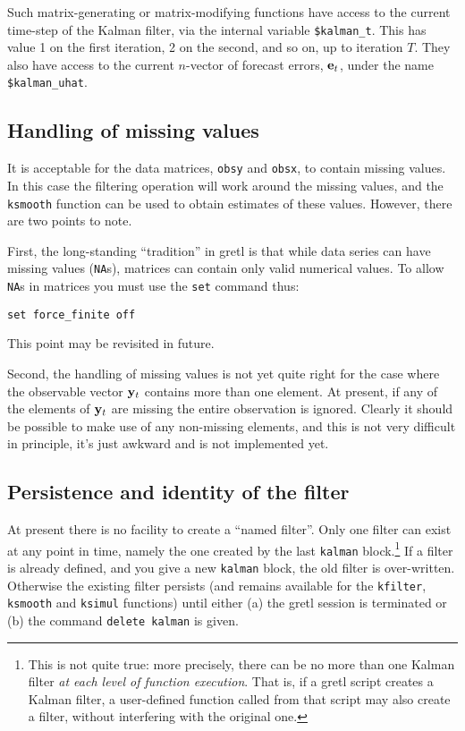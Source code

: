 \documentclass[a4paper]{article}
\newcommand{\obsvec}{\ensuremath\mathbf{y}}
\newcommand{\prederr}{\ensuremath\mathbf{e}}
\begin{document}
Such matrix-generating or matrix-modifying functions have access to
the current time-step of the Kalman filter, via the internal variable
\verb+$kalman_t+.  This has value 1 on the first iteration, 2 on the
second, and so on, up to iteration $T$.  They also have access to
the current $n$-vector of forecast errors, $\prederr_t$, under the
name \verb+$kalman_uhat+.


\subsection{Handling of missing values}

It is acceptable for the data matrices, \texttt{obsy} and
\texttt{obsx}, to contain missing values.  In this case the filtering
operation will work around the missing values, and the \texttt{ksmooth}
function can be used to obtain estimates of these values.  However,
there are two points to note.

First, the long-standing ``tradition'' in gretl is that while data
series can have missing values (\texttt{NA}s), matrices can contain
only valid numerical values.  To allow \texttt{NA}s in matrices you
must use the \texttt{set} command thus:
%
\begin{verbatim}
set force_finite off
\end{verbatim}
%
This point may be revisited in future.  

Second, the handling of missing values is not yet quite right for the
case where the observable vector $\obsvec_t$ contains more than one
element.  At present, if any of the elements of $\obsvec_t$ are
missing the entire observation is ignored.  Clearly it should be
possible to make use of any non-missing elements, and this is not
very difficult in principle, it's just awkward and is not
implemented yet.

\subsection{Persistence and identity of the filter}

At present there is no facility to create a ``named filter''.  Only
one filter can exist at any point in time, namely the one created by
the last \texttt{kalman} block.\footnote{This is not quite true: more
  precisely, there can be no more than one Kalman filter \textit{at
    each level of function execution}.  That is, if a gretl script
  creates a Kalman filter, a user-defined function called from that
  script may also create a filter, without interfering with the
  original one.}  If a filter is already defined, and you give a new
\texttt{kalman} block, the old filter is over-written.  Otherwise the
existing filter persists (and remains available for the
\texttt{kfilter}, \texttt{ksmooth} and \texttt{ksimul} functions)
until either (a) the gretl session is terminated or (b) the command
\texttt{delete kalman} is given.
\end{document}
